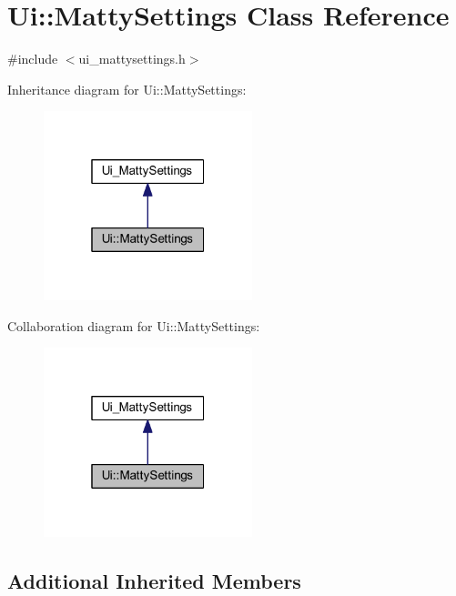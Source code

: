 \hypertarget{classUi_1_1MattySettings}{}\section{Ui\+:\+:Matty\+Settings Class Reference}
\label{classUi_1_1MattySettings}


{\ttfamily \#include $<$ui\+\_\+mattysettings.\+h$>$}



Inheritance diagram for Ui\+:\+:Matty\+Settings\+:
\nopagebreak
\begin{figure}[H]
\begin{center}
\leavevmode
\includegraphics[width=172pt]{classUi_1_1MattySettings__inherit__graph}
\end{center}
\end{figure}


Collaboration diagram for Ui\+:\+:Matty\+Settings\+:
\nopagebreak
\begin{figure}[H]
\begin{center}
\leavevmode
\includegraphics[width=172pt]{classUi_1_1MattySettings__coll__graph}
\end{center}
\end{figure}
\subsection*{Additional Inherited Members}



